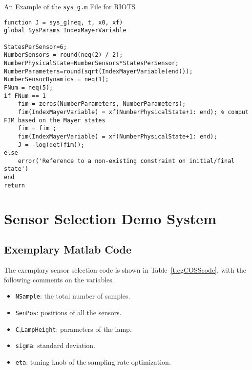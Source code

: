 \begin{table}[htb]
  \centering
  \caption{An Example of the \texttt{sys\protect\underline{\ }g.m} File for RIOTS}\label{t:egSysG}
\lstset{language=Matlab, breaklines=true, numbers=left, texcl, mathescape=true }
\begin{lstlisting}
function J = sys_g(neq, t, x0, xf)
global SysParams IndexMayerVariable

StatesPerSensor=6;
NumberSensors = round(neq(2) / 2);
NumberPhysicalState=NumberSensors*StatesPerSensor;
NumberParameters=round(sqrt(IndexMayerVariable(end)));
NumberSensorDynamics = neq(1);
FNum = neq(5);
if FNum == 1
    fim = zeros(NumberParameters, NumberParameters);
    fim(IndexMayerVariable) = xf(NumberPhysicalState+1: end); % comput FIM based on the Mayer states
    fim = fim';
    fim(IndexMayerVariable) = xf(NumberPhysicalState+1: end);
    J = -log(det(fim));
else
    error('Reference to a non-existing constraint on initial/final state')
end
return
\end{lstlisting}
\end{table}


\clearpage
\section{Sensor Selection Demo System}
\subsection{Exemplary Matlab Code}
The exemplary sensor selection code is shown in Table~\ref{t:egCOSScode}, with the following comments on the variables.

\begin{itemize}
\item \texttt{NSample}: the total number of samples.
\item \texttt{SenPos}: positions of all the sensors.
\item \texttt{C},\texttt{LampHeight}: parameters of the lamp.
\item \texttt{sigma}: standard deviation.
\item \texttt{eta}: tuning knob of the sampling rate optimization.
\end{itemize}

